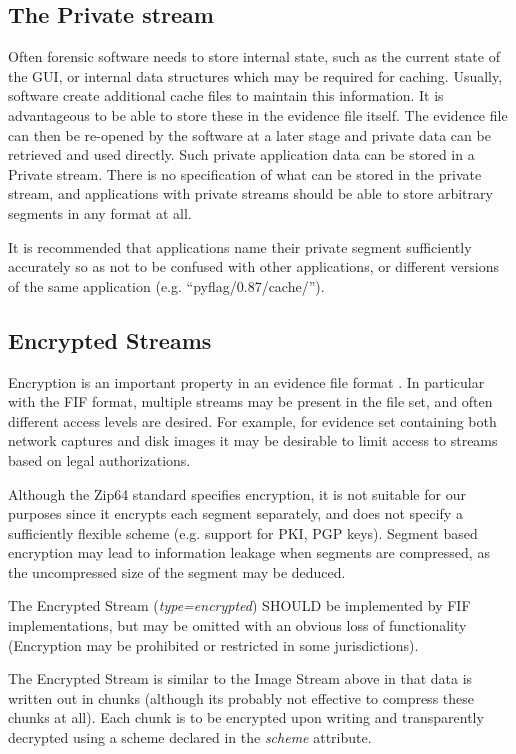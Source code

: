 \documentclass[10pt, conference]{IEEEtran}
\begin{document}
\subsection{The Private stream}
Often forensic software needs to store internal state, such as the
current state of the GUI, or internal data structures which may be
required for caching. Usually, software create additional cache files
to maintain this information. It is advantageous to be able to store
these in the evidence file itself. The evidence file can then be
re-opened by the software at a later stage and private data can be
retrieved and used directly. Such private application data can be
stored in a Private stream. There is no specification of what can be
stored in the private stream, and applications with private streams
should be able to store arbitrary segments in any format at all.

It is recommended that applications name their private segment
sufficiently accurately so as not to be confused with other
applications, or different versions of the same application
(e.g. ``pyflag/0.87/cache/'').

\subsection{Encrypted Streams}
Encryption is an important property in an evidence file format
\cite{AFF}. In particular with the FIF format, multiple streams may be
present in the file set, and often different access levels are
desired. For example, for evidence set containing both network
captures and disk images it may be desirable to limit access to
streams based on legal authorizations.

Although the Zip64 standard specifies encryption, it is not suitable
for our purposes since it encrypts each segment separately, and does
not specify a sufficiently flexible scheme (e.g. support for PKI, PGP
keys). Segment based encryption may lead to information leakage when
segments are compressed, as the uncompressed size of the segment may
be deduced.

The Encrypted Stream ({\em type=encrypted}) SHOULD be implemented by
FIF implementations, but may be omitted with an obvious loss of
functionality (Encryption may be prohibited or restricted in some
jurisdictions).

The Encrypted Stream is similar to the Image Stream above in that data
is written out in chunks (although its probably not effective to
compress these chunks at all). Each chunk is to be encrypted upon
writing and transparently decrypted using a scheme declared in the
{\em scheme} attribute. 
\end{document}
